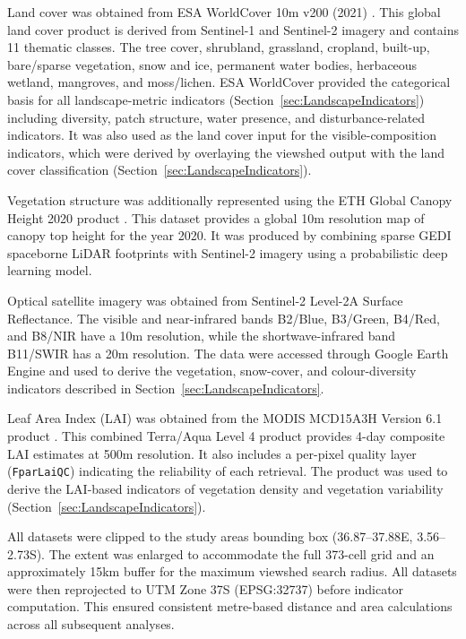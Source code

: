 \documentclass[11pt]{article}
\renewcommand{\_}{\textunderscore\allowbreak{}}
\begin{document}
Land cover was obtained from ESA WorldCover 10m v200 (2021) \citep{zanaga_esa_2022}. This global land cover product is derived from Sentinel-1 and Sentinel-2 imagery and contains 11 thematic classes. The tree cover, shrubland, grassland, cropland, built-up, bare/sparse vegetation, snow and ice, permanent water bodies, herbaceous wetland, mangroves, and moss/lichen. ESA WorldCover provided the categorical basis for all landscape-metric indicators (Section~\ref{sec:LandscapeIndicators}) including diversity, patch structure, water presence, and disturbance-related indicators. It was also used as the land cover input for the visible-composition indicators, which were derived by overlaying the viewshed output with the land cover classification (Section~\ref{sec:LandscapeIndicators}).

Vegetation structure was additionally represented using the ETH Global Canopy Height 2020 product \citep{lang_highresolution_2023}. This dataset provides a global 10m resolution map of canopy top height for the year 2020. It was produced by combining sparse GEDI spaceborne LiDAR footprints with Sentinel-2 imagery using a probabilistic deep learning model.

Optical satellite imagery was obtained from Sentinel-2 Level-2A Surface Reflectance. The visible and near-infrared bands B2/Blue, B3/Green, B4/Red, and B8/NIR have a 10m resolution, while the shortwave-infrared band B11/SWIR has a 20m resolution. The data were accessed through Google Earth Engine and used to derive the vegetation, snow-cover, and colour-diversity indicators described in Section~\ref{sec:LandscapeIndicators}.

Leaf Area Index (LAI) was obtained from the MODIS MCD15A3H Version 6.1 product \citep{myneni_mcd15a3h_2021}. This combined Terra/Aqua Level 4 product provides 4-day composite LAI estimates at 500m resolution. It also includes a per-pixel quality layer (\texttt{FparLai\_QC}) indicating the reliability of each retrieval. The product was used to derive the LAI-based indicators of vegetation density and vegetation variability (Section~\ref{sec:LandscapeIndicators}).

All datasets were clipped to the study areas bounding box (36.87--37.88\textdegree{}E, 3.56--2.73\textdegree{}S). The extent was enlarged to accommodate the full 373-cell grid and an approximately 15km buffer for the maximum viewshed search radius. All datasets were then reprojected to UTM Zone 37S (EPSG:32737) before indicator computation. This ensured consistent metre-based distance and area calculations across all subsequent analyses.
\end{document}
